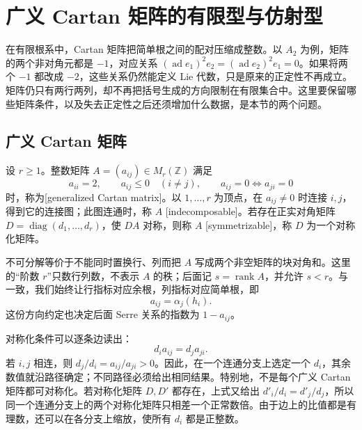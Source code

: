 
\section{广义 Cartan 矩阵的有限型与仿射型}
\label{b5:sec:G01}

在有限根系中，Cartan 矩阵把简单根之间的配对压缩成整数。以 \(A_2\) 为例，矩阵的两个非对角元都是 \(-1\)，对应关系 \((\operatorname{ad}e_1)^2e_2=(\operatorname{ad}e_2)^2e_1=0\)。如果将两个 \(-1\) 都改成 \(-2\)，这些关系仍然能定义 Lie 代数，只是原来的正定性不再成立。矩阵仍只有两行两列，却不再把括号生成的方向限制在有限集合中。这里要保留哪些矩阵条件，以及失去正定性之后还须增加什么数据，是本节的两个问题。

\subsection{广义 Cartan 矩阵}
\label{b5:subsec:G01:01}

\begin{definition}\label{b5:def:G-generalized-cartan}
	设 \(r\ge1\)。整数矩阵 \(A=(a_{ij})\in M_r(\mathbb Z)\) 满足
	\[
		a_{ii}=2,\qquad a_{ij}\le0\quad(i\ne j),\qquad a_{ij}=0\Longleftrightarrow a_{ji}=0
	\]
	时，称为[generalized Cartan matrix]。以 \(1,\ldots,r\) 为顶点，在 \(a_{ij}\ne0\) 时连接 \(i,j\)，得到它的连接图；此图连通时，称 \(A\) [indecomposable]。若存在正实对角矩阵 \(D=\operatorname{diag}(d_1,\ldots,d_r)\)，使 \(DA\) 对称，则称 \(A\) [symmetrizable]，称 \(D\) 为一个对称化矩阵。
\end{definition}

不可分解等价于不能同时置换行、列而把 \(A\) 写成两个非空矩阵的块对角和。这里的“阶数 \(r\)”只数行列数，不表示 \(A\) 的秩；后面记 \(s=\operatorname{rank}A\)，并允许 \(s<r\)。与一致，我们始终让行指标对应余根，列指标对应简单根，即
\[
	a_{ij}=\alpha_j(h_i).
\]
这份方向约定也决定后面 Serre 关系的指数为 \(1-a_{ij}\)。

\ProseParagraphBreak

对称化条件可以逐条边读出：
\[
	d_i a_{ij}=d_j a_{ji}.
\]
若 \(i,j\) 相连，则 \(d_j/d_i=a_{ij}/a_{ji}>0\)。因此，在一个连通分支上选定一个 \(d_i\)，其余数值就沿路径确定；不同路径必须给出相同结果。特别地，不是每个广义 Cartan 矩阵都可对称化。若对称化矩阵 \(D,D'\) 都存在，上式又给出 \(d'_i/d_i=d'_j/d_j\)，所以同一个连通分支上的两个对称化矩阵只相差一个正常数倍。由于边上的比值都是有理数，还可以在各分支上缩放，使所有 \(d_i\) 都是正整数。

